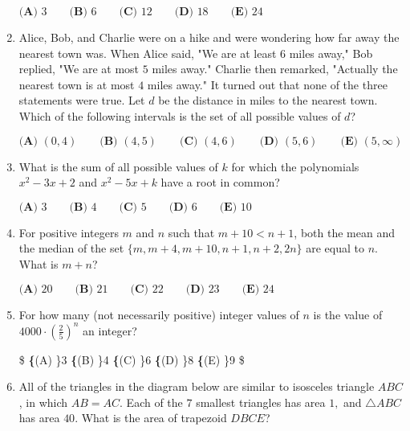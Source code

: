 \documentclass{article}
\begin{document}
\begin{enumerate}[label=\arabic*., itemsep=0.5em]
$\textbf{(A) }3\qquad\textbf{(B) }6\qquad\textbf{(C) }12\qquad\textbf{(D) }18\qquad\textbf{(E) }24$\par \vspace{0.5em}\item Alice, Bob, and Charlie were on a hike and were wondering how far away the nearest town was. When Alice said, "We are at least $6$ miles away," Bob replied, "We are at most $5$ miles away." Charlie then remarked, "Actually the nearest town is at most $4$ miles away." It turned out that none of the three statements were true. Let $d$ be the distance in miles to the nearest town. Which of the following intervals is the set of all possible values of $d$?

$\textbf{(A) }   (0,4)   \qquad        \textbf{(B) }   (4,5)   \qquad    \textbf{(C) }   (4,6)   \qquad   \textbf{(D) }  (5,6)  \qquad  \textbf{(E) }   (5,\infty) $\par \vspace{0.5em}\item What is the sum of all possible values of $k$ for which the polynomials $x^2 - 3x + 2$ and $x^2 - 5x + k$ have a root in common?

$\textbf{(A) }3 \qquad\textbf{(B) }4 \qquad\textbf{(C) }5 \qquad\textbf{(D) }6 \qquad\textbf{(E) }10 \qquad$\par \vspace{0.5em}\item For positive integers $m$ and $n$ such that $m+10<n+1$, both the mean and the median of the set $\{m, m+4, m+10, n+1, n+2, 2n\}$ are equal to $n$. What is $m+n$?

$\textbf{(A) }20\qquad\textbf{(B) }21\qquad\textbf{(C) }22\qquad\textbf{(D) }23\qquad\textbf{(E) }24$\par \vspace{0.5em}\item For how many (not necessarily positive) integer values of $n$ is the value of $4000\cdot \left(\tfrac{2}{5}\right)^n$ an integer?

\$
\textbf\{(A) \}3 \qquad
\textbf\{(B) \}4 \qquad
\textbf\{(C) \}6 \qquad
\textbf\{(D) \}8 \qquad
\textbf\{(E) \}9 \qquad
\$\par \vspace{0.5em}\item All of the triangles in the diagram below are similar to isosceles triangle $ABC$, in which $AB=AC$. Each of the $7$ smallest triangles has area $1,$ and $\triangle ABC$ has area $40$. What is the area of trapezoid $DBCE$?



\end{enumerate}
\end{document}
